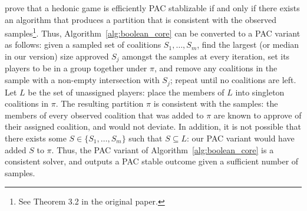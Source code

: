  prove that a hedonic game is efficiently PAC
stablizable if and only if there exists an algorithm that produces a partition
that is consistent with the observed samples\footnote{See Theorem 3.2 in the
original paper.}.
Thus, Algorithm~\ref{alg:boolean_core} can be converted to a PAC variant as
follows: given a sampled set of coalitions $S_1,\dots,S_m$, find the largest
(or median in our version) size approved $S_j$ amongst the samples at every
iteration, set its players to be in a group together under $\pi$, and remove
any coalitions in the sample with a non-empty intersection with $S_j$;
repeat until no coalitions are left.
Let $L$ be the set of unassigned players: place the members of $L$ into
singleton coalitions in $\pi$.
The resulting partition $\pi$ is consistent with the samples: the members of
every observed coalition that was added to $\pi$ are known to approve of their
assigned coalition, and would not deviate.
In addition, it is not possible that there exists some $S \in \{S_1,\dots,S_m\}$
such that $S \subseteq L$: our PAC variant would have added $S$ to $\pi$.
Thus, the PAC variant of Algorithm~\ref{alg:boolean_core} is a consistent solver,
and outputs a PAC stable outcome given a sufficient number of samples.
